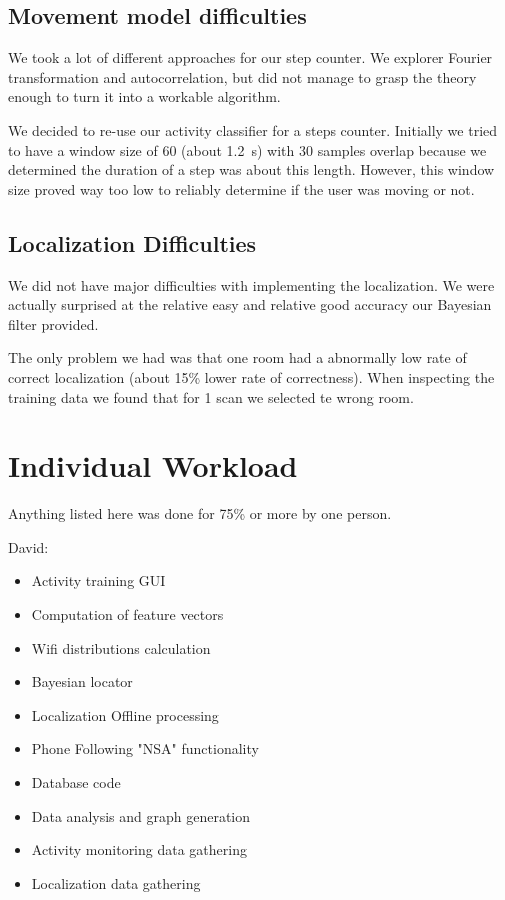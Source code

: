 \documentclass[a4paper,10pt,twoside]{IEEEtran}
\begin{document}
\subsection{Movement model difficulties}

We took a lot of different approaches for our step counter.
We explorer Fourier transformation and autocorrelation, but did not manage to grasp the theory enough to turn it into a workable algorithm.

We decided to re-use our activity classifier for a steps counter.
Initially we tried to have a window size of 60 (about 1.2~s) with 30 samples overlap because we determined the duration of a step was about this length.
However, this window size proved way too low to reliably determine if the user was moving or not.

\subsection{Localization Difficulties}

We did not have major difficulties with implementing the localization.
We were actually surprised at the relative easy and relative good accuracy our Bayesian filter provided.

The only problem we had was that one room had a abnormally low rate of correct localization (about 15\% lower rate of correctness).
When inspecting the training data we found that for 1 scan we selected te wrong room.

\section{Individual Workload}
\label{sec:individual-workload}
Anything listed here was done for 75\% or more by one person.

David:
\begin{itemize}
	\item Activity training GUI
    \item Computation of feature vectors
    \item Wifi distributions calculation 
    \item Bayesian locator
    \item Localization Offline processing
    \item Phone Following "NSA" functionality
    \item Database code
    \item Data analysis and graph generation
    \item Activity monitoring data gathering
    \item Localization data gathering
\end{itemize}
\end{document}
